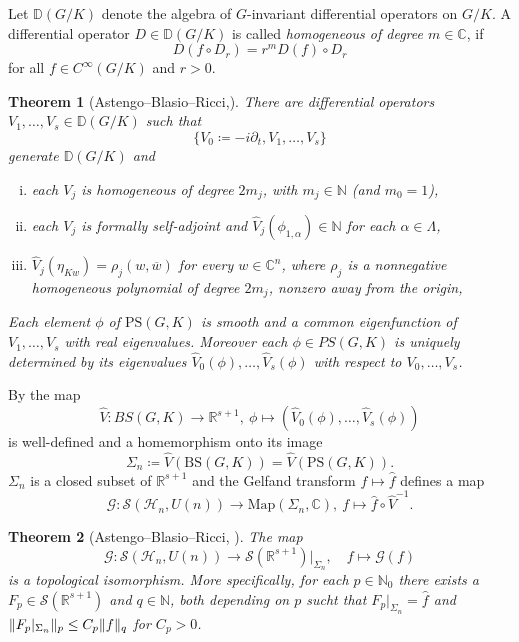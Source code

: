 \documentclass[12pt,reqno,a4paper]{amsart}
\theoremstyle{theorem}
\newtheorem{theorem}{Theorem}[section]
\theoremstyle{definition}
\numberwithin{theorem}{section}
\numberwithin{equation}{section}
\newcommand{\R}{\mathbb{R}}
\newcommand{\N}{\mathbb{N}}
\newcommand{\C}{\mathbb{C}}
\DeclarePairedDelimiter{\norm}{\lVert}{\rVert}
\begin{document}
Let $\mathbb{D}(G/K)$ denote the algebra of $G$-invariant differential operators on $G/K$. A differential operator $D\in \mathbb{D}(G/K)$ is called \emph{homogeneous of degree $m\in \C$}, if 
\[D(f\circ D_r) = r^mD(f)\circ D_r\]
for all $f\in C^\infty(G/K)$ and $r>0$.
\begin{theorem}[Astengo--Blasio--Ricci,\cite{AdBRSphericalSchwartz}]\label{t:differential_operators_heisenberg_group}
	There are differential operators $V_1,\dots, V_s\in \mathbb{D}(G/K)$ such that \[\{V_0\coloneqq-i\partial_t, V_1,\dots, V_s\}\] generate $\mathbb{D}(G/K)$ and 
	\begin{enumerate}[(i)]
		\item each $V_j$ is homogeneous of degree $2m_j$, with $m_j\in \N$ (and $m_0 = 1$),
		\item each $V_j$ is formally self-adjoint and $\widehat{V}_j(\phi_{1,\alpha})\in \N$ for each $\alpha\in \Lambda$,
		\item $\widehat{V}_j(\eta_{Kw}) = \rho_j(w,\overline{w})$ for every $w\in \C^n$, where $\rho_j$ is a nonnegative homogeneous polynomial of degree $2m_j$, nonzero away from the origin,
	\end{enumerate}
	Each element $\phi$ of $\mathrm{PS}(G,K)$ is smooth and a common eigenfunction of $V_1,\dots, V_s$ with real eigenvalues. 
	Moreover each $\phi\in PS(G, K)$ is uniquely determined by its eigenvalues $\widehat{V}_0(\phi),\dots, \widehat{V}_s(\phi)$ with respect to $V_0,\dots, V_s$. 
\end{theorem}
By \cite{AdBRSphericalSchwartz} the map 
\[
\widehat{V}: BS(G, K) \to \R^{s+1},\ \phi \mapsto (\widehat{V}_0(\phi), \dots, \widehat{V}_s(\phi))
\]
is well-defined and a homemorphism onto its image 
\[
\Sigma_n\coloneqq \widehat{V}(\mathrm{BS}(G, K))=\widehat{V}(\mathrm{PS}(G, K)).
\]
$\Sigma_n$ is a closed subset of $\R^{s+1}$ and the Gelfand transform $f\mapsto \widehat{f}$ defines a map 
\[	
\mathcal{G}:\mathcal{S}(\mathcal{H}_n, U(n))\to \mathrm{Map}(\Sigma_n, \C),\ f\mapsto \widehat{f}\circ \widehat{V}^{-1}.
\]
\begin{theorem}[Astengo--Blasio--Ricci, \cite{AdBRSphericalSchwartz}]\label{t:image_Schwartz_space_Heisenberg_group}
	The map
	\[
	\mathcal{G}: \mathscr{S}(\mathcal{H}_n, U(n))\to \mathscr{S}(\R^{s+1})|_{\Sigma_n},\quad f \mapsto \mathcal{G}(f)
	\]
	is a topological isomorphism. 
	More specifically, for each $p\in \N_0$ there exists a $F_p\in \mathscr{S}(\R^{s+1})$ and $q\in \N$, both depending on $p$ sucht that $F_p|_{\Sigma_n} = \widehat{f}$ and $\norm{F_p|_{\Sigma_n}}_{p}\leq C_p \norm{f}_q$ for $C_p > 0$. 
\end{theorem}
\end{document}
